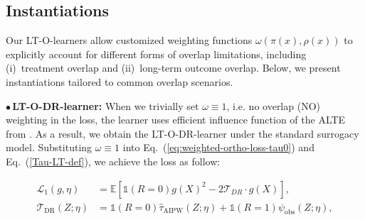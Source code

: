 \documentclass{article}
\theoremstyle{plain}
\theoremstyle{definition}
\theoremstyle{remark}
\newcommand{\1}{\mathds{1}}                %
\newcommand{\methods}{LT-O-learners\xspace}
\newcommand{\DR}{LT-O-DR-learner\xspace}
\begin{document}
\subsection{Instantiations}
\label{subsec:instantiation}

Our \methods allow customized weighting functions $\omega(\pi(x),\rho(x))$ to explicitly account for different forms of overlap limitations, including (i)~treatment overlap and (ii)~long-term outcome overlap. Below, we present instantiations tailored to common overlap scenarios.





$\bullet$\,\textbf{\DR: } When we trivially set $\omega\equiv1$, i.e. no overlap (NO) weighting in the loss, the learner uses efficient influence function of the ALTE from \citet{Chen.2023, Athey.2025}. As a result, we obtain the \DR under the standard surrogacy model. Substituting $\omega\equiv1$ into Eq.~(\ref{eq:weighted-ortho-loss-tau0}) and Eq.~(\ref{Tau-LT-def}), we achieve the loss as follow:

\footnotesize
\vspace{-0.5cm}
\begin{align}
    \mathcal{L}_1(g, \eta) &= \mathbb{E} \left[ \1(R=0)g(X)^2 -2\mathcal{T}_{DR}\cdot g(X)\right], \\
    \mathcal{T}_\mathrm{DR}(Z;\eta) & =\1(R=0) \hat{\tau}_\mathrm{AIPW}(Z;\eta) + \1(R=1)\psi_\mathrm{obs}(Z;\eta)  \label{DR-pseudo-outcome},
\end{align}
\vspace{-0.5cm}
\normalsize
\end{document}
